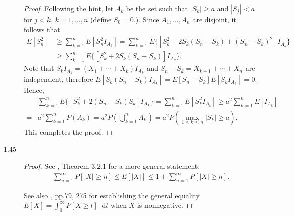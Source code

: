 \documentclass{article}
\newcommand{\dd}{\mathop{}\!\mathrm{d}}
\theoremstyle{definition}
\theoremstyle{plain}
\theoremstyle{remark}
\begin{document}
\begin{description}
\begin{proof}
Following the hint, let $A_k$ be the set such that $|S_k| \geq a$ and $|S_j| < a$
for $j < k$, $k = 1, \ldots, n$ (define $S_0 = 0$.). Since $A_1, \ldots, A_n$ are 
disjoint, it follows that
\begin{align*}
    E[S_n^2] & \geq \sum_{k = 1}^n E[S_n^2 I_{A_k}] 
    = \sum_{k = 1}^n E\{[S_k^2 + 2S_k(S_n - S_k) + (S_n - S_k)^2]I_{A_k}\} \\
    & \geq \sum_{k = 1}^n E\{[S_k^2 + 2S_k(S_n - S_k)]I_{A_k}\}.
\end{align*}
Note that $S_kI_{A_k} = (X_1 + \cdots + X_k)I_{A_k}$ and $S_n - S_k = X_{k + 1} + 
\cdots + X_n$ are independent, therefore $E[S_k(S_n - S_k)I_{A_k}] = 
E[S_n - S_k]E[S_kI_{A_k}] = 0$. Hence,
\begin{align*}
    & \sum_{k = 1}^n E\{[S_k^2 + 2(S_n - S_k)S_k]I_{A_k}\} = 
    \sum_{k = 1}^n E[S_k^2I_{A_k}] \geq a^2 \sum_{k = 1}^n E[I_{A_k}] \\
    = & a^2 \sum_{k = 1}^n P(A_k) = a^2 P\left(\bigcup_{k = 1}^n A_k\right) 
    = a^2 P\left(\max_{1 \leq k \leq n} |S_k| \geq a \right).
\end{align*}
This completes the proof.
\end{proof}

\item[1.45]
\begin{proof}
See \cite{chung2001probability}, Theorem 3.2.1 for a more general statement:
\begin{align*}
    \sum_{n = 1}^\infty P[|X| \geq n] \leq E[|X|] \leq 
    1 + \sum_{n = 1}^\infty P[|X| \geq n].
\end{align*}

See also \cite{billingsley95}, pp.79, 275 for establishing the general equality
$E[X] = \int_0^\infty P[X \geq t] \dd t$ when $X$ is nonnegative.
\end{proof}
\end{description}

\newpage
\end{document}
